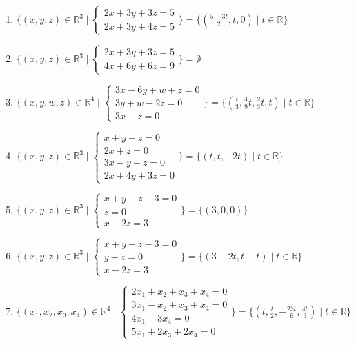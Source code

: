 \documentclass[11pt,a4paper]{article}
\begin{document}
\begin{enumerate}
\item $\displaystyle \{(x, y, z) \in \mathbb{R}^{3} \mid \begin{cases} 2x + 3y + 3z = 5 \\ 2x + 3y + 4z = 5 \end{cases}\} = \{(\frac{5 - 3t}{2}, t, 0) \mid t \in \mathbb{R}\}$
\item $\displaystyle \{(x, y, z) \in \mathbb{R}^{3} \mid \begin{cases} 2x + 3y + 3z = 5 \\ 4x + 6y + 6z = 9 \end{cases}\} = \emptyset$
\item $\displaystyle \{(x, y, w, z) \in \mathbb{R}^{4} \mid \begin{cases} 3x - 6y + w + z = 0 \\ 3y + w - 2z = 0 \\ 3x - z = 0 \end{cases}\} = \{(\frac{t}{3}, \frac{4}{9} t, \frac{2}{3} t, t) \mid t \in \mathbb{R}\}$
\item $\displaystyle \{(x, y, z) \in \mathbb{R}^{3} \mid \begin{cases} x + y + z = 0 \\ 2x + z = 0 \\ 3x - y + z = 0 \\ 2x + 4y + 3z = 0 \end{cases}\} = \{(t, t, -2t) \mid t \in \mathbb{R}\}$
\item $\displaystyle \{(x, y, z) \in \mathbb{R}^{3} \mid \begin{cases} x + y - z - 3 = 0 \\ z = 0 \\ x - 2z = 3 \end{cases}\} = \{(3, 0, 0)\}$
\item $\displaystyle \{(x, y, z) \in \mathbb{R}^{3} \mid \begin{cases} x + y - z - 3 = 0 \\ y + z = 0 \\ x - 2z = 3 \end{cases}\} = \{(3 - 2t, t, -t) \mid t \in \mathbb{R}\}$
\item $\displaystyle \{(x_{1}, x_{2}, x_{3}, x_{4}) \in \mathbb{R}^{4} \mid \begin{cases} 2x_{1} + x_{2} + x_{3} + x_{4} = 0 \\ 3x_{1} - x_{2} + x_{3} + x_{4} = 0 \\ 4x_{1} - 3x_{4} = 0 \\ 5x_{1} + 2x_{3} + 2x_{4} = 0 \end{cases}\} = \{(t, \frac{t}{2}, -\frac{23t}{6}, \frac{4t}{3}) \mid t \in \mathbb{R}\}$

\end{enumerate}
\end{document}

